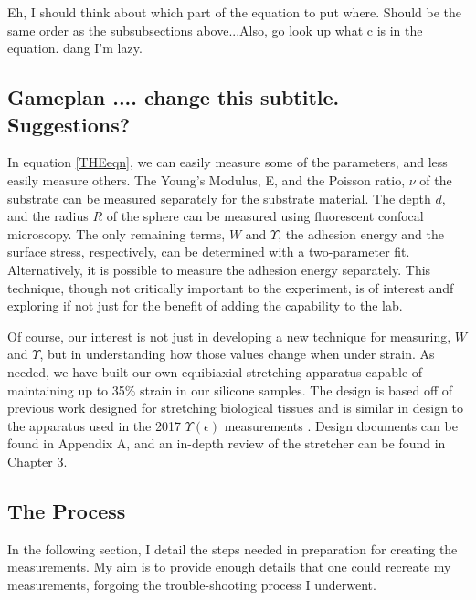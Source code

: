 Eh, I should think about which part of the equation to put where. Should be the same order as the subsubsections above...Also, go look up what c is in the equation. dang I'm lazy.



\subsection{Gameplan .... change this subtitle. Suggestions?}
In equation \ref{THEeqn}, we can easily measure some of the parameters, and less easily measure others. The Young's Modulus, E, and the Poisson ratio, $\nu$ of the substrate can be measured separately for the substrate material. The depth $d$, and the radius $R$ of the sphere can be measured using fluorescent confocal microscopy. The only remaining terms, $W$ and $\Upsilon$, the adhesion energy and the surface stress, respectively, can be determined with a two-parameter fit. Alternatively, it is possible to measure the adhesion energy separately. This technique, though not critically important to the experiment, is of interest andf exploring if not just for the benefit of adding the capability to the lab.   

Of course, our interest is not just in developing a new technique for measuring, $W$ and $\Upsilon$, but in understanding how those values change when under strain. As needed, we have built our own equibiaxial stretching apparatus capable of maintaining up to 35\% strain in our silicone samples. The design is based off of previous work designed for stretching biological tissues \cite{na2008time} and is similar in design to the apparatus used in the 2017 $\Upsilon(\epsilon)$ measurements \cite{xu2017direct}. Design documents can be found in Appendix A, and an in-depth review of the stretcher can be found in Chapter 3. 

\subsection{The Process}
In the following section, I detail the steps needed in preparation for creating the measurements. My aim is to provide enough details that one could recreate my measurements, forgoing the trouble-shooting process I underwent. 

